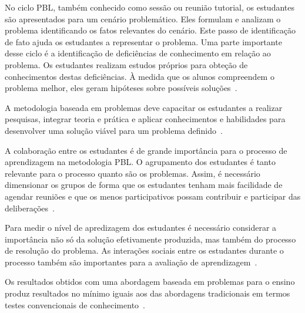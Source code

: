 
No ciclo PBL, também conhecido como sessão ou reunião tutorial, os estudantes
são apresentados para um cenário problemático.
Eles formulam e analizam o problema identificando os fatos relevantes do cenário.
Este passo de identificação de fato ajuda os estudantes a representar o problema.
Uma parte importante desse ciclo é a identificação de deficiências
de conhecimento em relação ao problema.
Os estudantes realizam estudos próprios para obteção de
conhecimentos destas deficiências.
À medida que os alunos compreendem o problema melhor, eles geram
hipóteses sobre possíveis soluções~\cite{hmelo2004problem}.


A metodologia baseada em problemas deve capacitar os estudantes a
realizar pesquisas, integrar teoria e prática e aplicar conhecimentos
e habilidades para desenvolver uma solução viável para
um problema definido~\cite{savery2015overview}.


A colaboração entre os estudantes é de grande importância para o
processo de aprendizagem na metodologia PBL.
O agrupamento dos estudantes é tanto relevante para o processo quanto
são os problemas. Assim, é necessário dimensionar os grupos de forma
que os estudantes tenham mais facilidade de agendar reuniões e que
os menos participativos possam contribuir e participar das
deliberações~\cite{savery2015overview, albanese2010problem}.

Para medir o nível de apredizagem dos estudantes é necessário considerar
a importância não só da solução efetivamente produzida, mas também do
processo de resolução do problema.
As interações sociais entre os estudantes durante
o processo também são importantes para a
avaliação de aprendizagem~\cite{albanese2010problem}.

Os resultados obtidos com uma abordagem baseada em problemas para o ensino
produz resultados no mínimo iguais aos das abordagens tradicionais em
termos testes convencionais de conhecimento~\cite{savery2015overview}.

